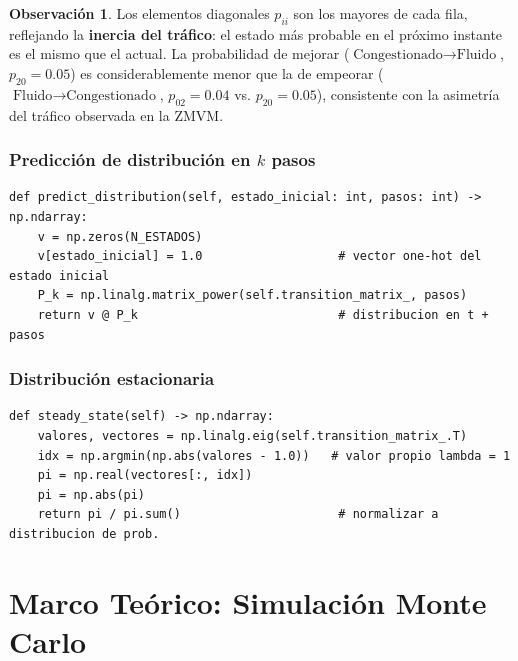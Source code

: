 \documentclass[12pt, a4paper]{article}
\theoremstyle{definition}
\newtheorem{observacion}{Observación}[section]
\begin{document}
\begin{observacion}
Los elementos diagonales $p_{ii}$ son los mayores de cada fila, reflejando la
\textbf{inercia del tráfico}: el estado más probable en el próximo instante es
el mismo que el actual. La probabilidad de mejorar
($\text{Congestionado} \to \text{Fluido}$, $p_{20} = 0.05$) es considerablemente
menor que la de empeorar ($\text{Fluido} \to \text{Congestionado}$, $p_{02} = 0.04$
vs. $p_{20} = 0.05$), consistente con la asimetría del tráfico observada en la ZMVM.
\end{observacion}

\subsubsection*{Predicción de distribución en $k$ pasos}

\begin{lstlisting}[caption={Implementación de la ecuación~\eqref{eq:k_step}.}]
def predict_distribution(self, estado_inicial: int, pasos: int) -> np.ndarray:
    v = np.zeros(N_ESTADOS)
    v[estado_inicial] = 1.0                   # vector one-hot del estado inicial
    P_k = np.linalg.matrix_power(self.transition_matrix_, pasos)
    return v @ P_k                            # distribucion en t + pasos
\end{lstlisting}

\subsubsection*{Distribución estacionaria}

\begin{lstlisting}[caption={Cálculo de $\bm{\pi}^*$ por descomposición espectral, ecuación~\eqref{eq:eigenvector}.}]
def steady_state(self) -> np.ndarray:
    valores, vectores = np.linalg.eig(self.transition_matrix_.T)
    idx = np.argmin(np.abs(valores - 1.0))   # valor propio lambda = 1
    pi = np.real(vectores[:, idx])
    pi = np.abs(pi)
    return pi / pi.sum()                      # normalizar a distribucion de prob.
\end{lstlisting}

\section{Marco Teórico: Simulación Monte Carlo}
\end{document}
